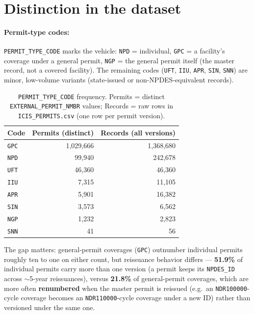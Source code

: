 \documentclass[11pt]{article}
\begin{document}
\section{Distinction in the dataset}
\label{sec:dataset}

\paragraph{Permit-type codes:} \texttt{PERMIT\_TYPE\_CODE} marks the vehicle:
\texttt{NPD} = individual, \texttt{GPC} = a facility's coverage under a general
permit, \texttt{NGP} = the general permit itself (the master record, not a
covered facility). The remaining codes (\texttt{UFT}, \texttt{IIU},
\texttt{APR}, \texttt{SIN}, \texttt{SNN}) are minor, low-volume variants
(state-issued or non-NPDES-equivalent records).

\begin{table}[h]
\centering
\caption{\texttt{PERMIT\_TYPE\_CODE} frequency. Permits = distinct
\texttt{EXTERNAL\_PERMIT\_NMBR} values; Records = raw rows in
\texttt{ICIS\_PERMITS.csv} (one row per permit version).}\label{tab:codes}
\begin{tabular}{l r r}
\toprule
Code & Permits (distinct) & Records (all versions) \\
\midrule
\texttt{GPC} & 1,029,666 & 1,368,680 \\
\texttt{NPD} & 99,940 & 242,678 \\
\texttt{UFT} & 46,360 & 46,360 \\
\texttt{IIU} & 7,315 & 11,105 \\
\texttt{APR} & 5,901 & 16,382 \\
\texttt{SIN} & 3,573 & 6,562 \\
\texttt{NGP} & 1,232 & 2,823 \\
\texttt{SNN} & 41 & 56 \\
\bottomrule
\end{tabular}
\end{table}

The gap matters: general-permit coverages (\texttt{GPC}) outnumber individual
permits roughly ten to one on either count, but reissuance behavior differs ---
\textbf{51.9\%} of individual permits carry more than one version (a permit keeps
its \texttt{NPDES\_ID} across $\sim$5-year reissuances), versus \textbf{21.8\%}
of general-permit coverages, which are more often \textbf{renumbered} when the
master permit is reissued (e.g.\ an \texttt{NDR100000}-cycle coverage becomes an
\texttt{NDR110000}-cycle coverage under a new ID) rather than versioned under the
same one.
\end{document}
